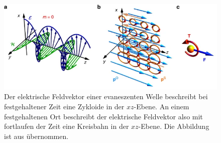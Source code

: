 \documentclass[a4paper, titlepage,  ngerman, fullpage]{book}
\begin{document}
	\begin{figure}
		\centering
		\includegraphics[width=0.7\linewidth]{figures/spin/ev_spin}
		\caption[Drehimpuls von evaneszenter EM-Welle]{Der elektrische Feldvektor einer evaneszenten Welle beschreibt bei festgehaltener Zeit eine Zykloide in der $xz$-Ebene. An einem festgehaltenen Ort beschreibt der elektrische Feldvektor also mit fortlaufen der Zeit eine Kreisbahn in der $xz$-Ebene. Die Abbildung ist aus \cite{Bliokh.2014} übernommen.}
		\label{fig:ev_spin}
	\end{figure}
\end{document}
